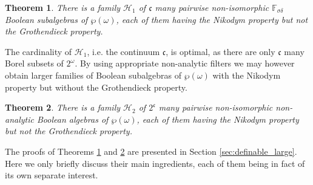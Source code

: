 \documentclass[a4paper,11pt,fleqn]{amsart}
\newtheorem{theoreml}{Theorem}[section]
\theoremstyle{definition}
\theoremstyle{remark}
\numberwithin{equation}{section}
\newcommand{\frakc}{\mathfrak{c}}
\newcommand{\N}{\mathbb{N}}
\newcommand{\hH}{\mathcal{H}}
\newcommand{\wo}{{\wp(\omega)}}%
\begin{document}
\begin{theoreml}\label{thm:main_large_borel}
There is a family $\hH_1$ of $\frakc$ many pairwise non-isomorphic $\mathbb{F}_{\sigma\delta}$ Boolean subalgebras of $\wo$, each of them having the Nikodym property but not the Grothendieck property.
\end{theoreml}

The cardinality of $\hH_1$, i.e. the continuum $\frakc$, is optimal, as there are only $\frakc$ many Borel subsets of $2^\omega$. By using appropriate non-analytic filters we may however obtain larger families of Boolean subalgebras of $\wo$ with the Nikodym property but without the Grothendieck property.

\begin{theoreml}\label{thm:main_large_nonborel}
There is a family $\hH_2$ of $2^\frakc$ many pairwise non-isomorphic non-analytic Boolean algebras of $\wo$, each of them having the Nikodym property but not the Grothendieck property.
\end{theoreml}

The proofs of Theorems \ref{thm:main_large_borel} and \ref{thm:main_large_nonborel} are presented in Section \ref{sec:definable_large}. Here we only briefly discuss their main ingredients, each of them being in fact of its own separate interest.

\medskip
\end{document}
